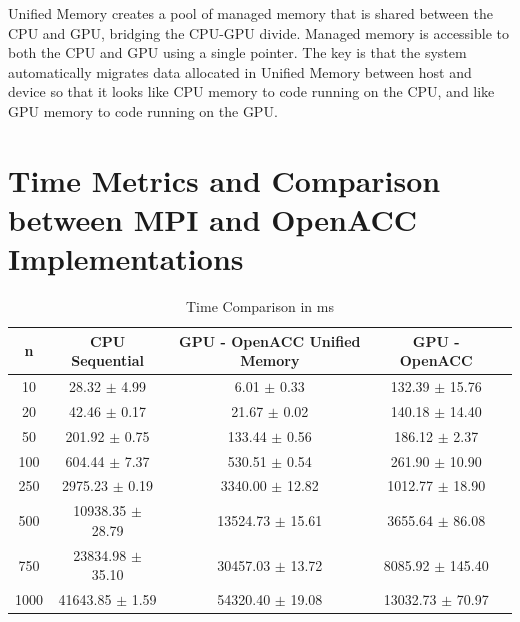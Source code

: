 \documentclass[a4paper,12pt]{article}
\begin{document}
Unified Memory creates a pool of managed memory that is shared between the CPU and GPU, bridging the CPU-GPU divide. Managed memory is accessible to both the CPU and GPU using a single pointer. The key is that the system automatically migrates data allocated in Unified Memory between host and device so that it looks like CPU memory to code running on the CPU, and like GPU memory to code running on the GPU.

\section{Time Metrics and Comparison
between MPI and OpenACC Implementations}

\begin{table}[H]
    \centering
    \caption{Time Comparison in ms}
    \label{tab:label}
    \begin{tabular}{| c | c | c | c | c |}
        \hline
        n    & CPU Sequential & GPU - OpenACC Unified Memory & GPU - OpenACC \\
        \hline \hline
10 & 28.32 $\pm$ 4.99 & 6.01 $\pm$ 0.33 & 132.39 $\pm$ 15.76 \\ \hline
20 & 42.46 $\pm$ 0.17 & 21.67 $\pm$ 0.02 & 140.18 $\pm$ 14.40 \\ \hline
50 & 201.92 $\pm$ 0.75 & 133.44 $\pm$ 0.56 & 186.12 $\pm$ 2.37 \\ \hline
100 & 604.44 $\pm$ 7.37 & 530.51 $\pm$ 0.54 & 261.90 $\pm$ 10.90 \\ \hline
250 & 2975.23 $\pm$ 0.19 & 3340.00 $\pm$ 12.82 & 1012.77 $\pm$ 18.90 \\ \hline
500 & 10938.35 $\pm$ 28.79 & 13524.73 $\pm$ 15.61 & 3655.64 $\pm$ 86.08 \\ \hline
750 & 23834.98 $\pm$ 35.10 & 30457.03 $\pm$ 13.72 & 8085.92 $\pm$ 145.40 \\ \hline
1000 & 41643.85 $\pm$ 1.59 & 54320.40 $\pm$ 19.08 & 13032.73 $\pm$ 70.97 \\ \hline
    \end{tabular}
\end{table}
\end{document}
